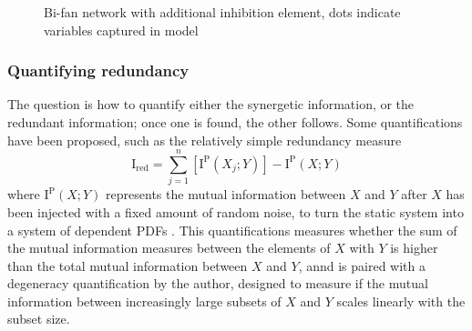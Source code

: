 \documentclass[../main.tex]{subfiles}
\begin{document}
\begin{figure}[ht]
\begin{center}
\end{center}
\caption{Bi-fan network with additional inhibition element, dots indicate variables captured in model}
\label{bifan_syn}
\end{figure}

\subsubsection{Quantifying redundancy}

The question is how to quantify either the synergetic information, or the redundant information; once one is found, the other follows.
Some quantifications have been proposed, such as the relatively simple redundancy measure
%
\begin{equation}
\mathrm{I}_\mathrm{red} = \sum_{j=1}^n [\mathrm{I}^\mathrm{P}(X_j;Y)] - \mathrm{I}^\mathrm{P}(X;Y)
\end{equation}
%
where $\mathrm{I}^\mathrm{P}(X;Y)$ represents the mutual information between $X$ and $Y$ after $X$ has been injected with a fixed amount of random noise, to turn the static system into a system of dependent PDFs \cite{tononi1999measures}.
This quantifications measures whether the sum of the mutual information measures between the elements of $X$ with $Y$ is higher than the total mutual information between $X$ and $Y$, annd is paired with a degeneracy quantification by the author, designed to measure if the mutual information between increasingly large subsets of $X$ and $Y$ scales linearly with the subset size.
\end{document}
